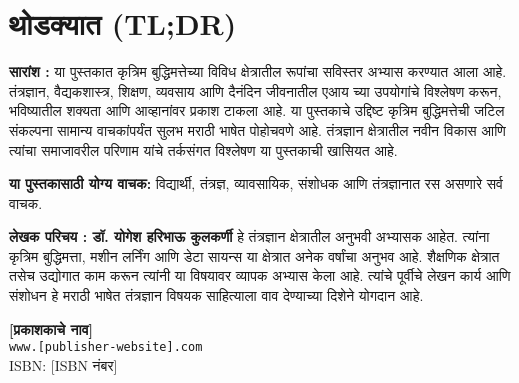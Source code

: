 \chapter*{थोडक्यात  (TL;DR)}

\thispagestyle{empty}
\null\vfill


\noindent\textbf{सारांश :} या पुस्तकात कृत्रिम बुद्धिमत्तेच्या विविध क्षेत्रातील रूपांचा सविस्तर अभ्यास करण्यात आला आहे. तंत्रज्ञान, वैद्यकशास्त्र, शिक्षण, व्यवसाय आणि दैनंदिन जीवनातील एआय च्या उपयोगांचे विश्लेषण करून, भविष्यातील शक्यता आणि आव्हानांवर प्रकाश टाकला आहे. या पुस्तकाचे उद्दिष्ट कृत्रिम बुद्धिमत्तेची जटिल संकल्पना सामान्य वाचकांपर्यंत सुलभ मराठी भाषेत पोहोचवणे आहे. तंत्रज्ञान क्षेत्रातील नवीन विकास आणि त्यांचा समाजावरील परिणाम यांचे तर्कसंगत विश्लेषण या पुस्तकाची खासियत आहे.

\vspace{1.5em}

\noindent\textbf{या पुस्तकासाठी योग्य वाचक:} विद्यार्थी, तंत्रज्ञ, व्यावसायिक, संशोधक आणि तंत्रज्ञानात रस असणारे सर्व वाचक.

\vspace{1.5em}

\noindent\textbf{लेखक परिचय :  डॉ. योगेश हरिभाऊ कुलकर्णी} हे तंत्रज्ञान क्षेत्रातील अनुभवी अभ्यासक आहेत. त्यांना कृत्रिम बुद्धिमत्ता, मशीन लर्निंग आणि डेटा सायन्स या क्षेत्रात अनेक वर्षांचा अनुभव आहे. शैक्षणिक क्षेत्रात तसेच उद्योगात काम करून त्यांनी या विषयावर व्यापक अभ्यास केला आहे.  त्यांचे पूर्वीचे लेखन कार्य आणि संशोधन हे मराठी भाषेत तंत्रज्ञान विषयक साहित्याला वाव देण्याच्या दिशेने योगदान आहे.

\vspace{1em}

\begin{center}
\end{center}

\vfill

\begin{center}
\textbf{[प्रकाशकाचे नाव]}\\
\texttt{www.[publisher-website].com}\\
ISBN: [ISBN नंबर]
\end{center}




